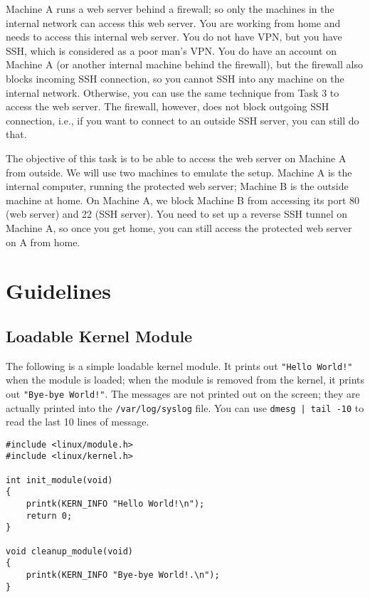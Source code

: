 Machine A runs a web server behind a firewall; so only the machines 
in the internal network can access this web server. 
You are working from home and needs to access this internal web server. 
You do not have VPN, but you have SSH, which is considered as 
a poor man's VPN. You do have an account on Machine A (or another internal machine behind the firewall), 
but the firewall also blocks incoming SSH connection, so you cannot SSH into any machine on the
internal network. Otherwise, you can use the same technique from Task 3 to access the web server. 
The firewall, however, does not block outgoing SSH connection, i.e., 
if you want to connect to an outside SSH server, you can still do that. 


The objective of this task is to be able to access the web server on Machine A from
outside.  We will use two machines to emulate the setup. Machine A is the internal computer,
running the protected web server; Machine B is the outside machine at home. 
On Machine A, we block Machine B from accessing its port 80 (web server) and 22 (SSH server).
You need to set up a reverse SSH tunnel on Machine A, so once you get home, you can 
still access the protected web server on A from home. 




\section{Guidelines}
\label{firewall:sec:guidelines}


\subsection{Loadable Kernel Module}

The following is a simple loadable kernel module. It prints out 
{\tt "Hello World!"} when the module is loaded; when the module
is removed from the kernel, it prints out {\tt "Bye-bye World!"}.
The messages are not printed out on the screen; they are 
actually printed into the {\tt /var/log/syslog} file. You can
use {\tt dmesg | tail -10} to read the last 10 lines of message.


\begin{lstlisting}
#include <linux/module.h>
#include <linux/kernel.h>

int init_module(void)
{
    printk(KERN_INFO "Hello World!\n");
    return 0;
}

void cleanup_module(void)
{
    printk(KERN_INFO "Bye-bye World!.\n");
}
\end{lstlisting}

